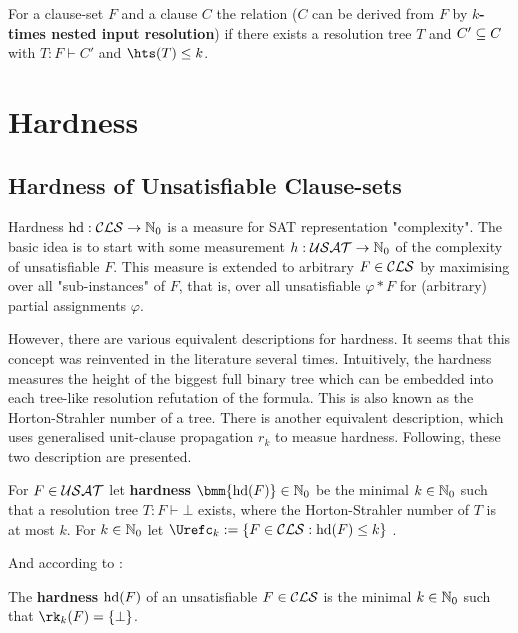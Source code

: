 \documentclass[12pt]{book}
\begin{document}
\begin{defi}\label{def:geninpres}
      For a clause-set $F$ and a clause $C$ the relation  ($C$ can be derived from $F$ by \textbf{$k$-times nested input resolution}) if there exists a resolution tree $T$ and $C' \subseteq C$ with $T : F \vdash C'$ and $\hts(T) \le k$.
\end{defi}
\section{Hardness}
\label{sec:Hardness}
\subsection{Hardness of Unsatisfiable Clause-sets}
\label{sec:Hardnessunsat}
Hardness $\operatorname{hd} :\mathcal{CLS} \rightarrow \mathbb{N}_0$ is a measure for SAT representation "complexity". The basic idea is to start with some measurement
$ h : \mathcal{USAT} \rightarrow \mathbb{N}_0$ of the complexity of unsatisfiable $F$. This measure is extended to arbitrary $F \in \mathcal{CLS}$ by maximising 
over all "sub-instances" of $F$, that is, over all unsatisfiable $\varphi * F$ for (arbitrary) partial assignments $\varphi$.

However, there are various equivalent descriptions for hardness. It seems that this concept was reinvented in the literature several times. 
Intuitively, the hardness measures the height of the biggest full binary tree which can be embedded into each tree-like resolution 
refutation of the formula. This is also known as the Horton-Strahler number of a tree. There is another equivalent description, 
which uses generalised unit-clause propagation $r_k$ to measue hardness. Following, these two description are presented.

\begin{defi}\label{def:hardness1}
      For $F \in \mathcal{USAT}$ let \textbf{hardness} $\bmm{\hardness(F)} \in \NNZ$ be the minimal $k \in \mathbb{N}_0$ such that a resolution tree $T : F \vdash \bot$ 
	  exists, where the Horton-Strahler number of $T$ is at most $k$. For $k \in \mathbb{N}_0$ let $\Urefc_k  := \{F \in \Cls : \hardness(F) \leq k\}$ \cite{h5}.
\end{defi}
And according to \cite{h13}:
\begin{defi}\label{def:hardness2}
  The \textbf{hardness} $\operatorname{hd}(F)$ of an unsatisfiable $F \in \mathcal{CLS}$ is the minimal $k \in \mathbb{N}_0$ such that $\rk_k(F) = \set{\bot}$.
\end{defi}
\end{document}
